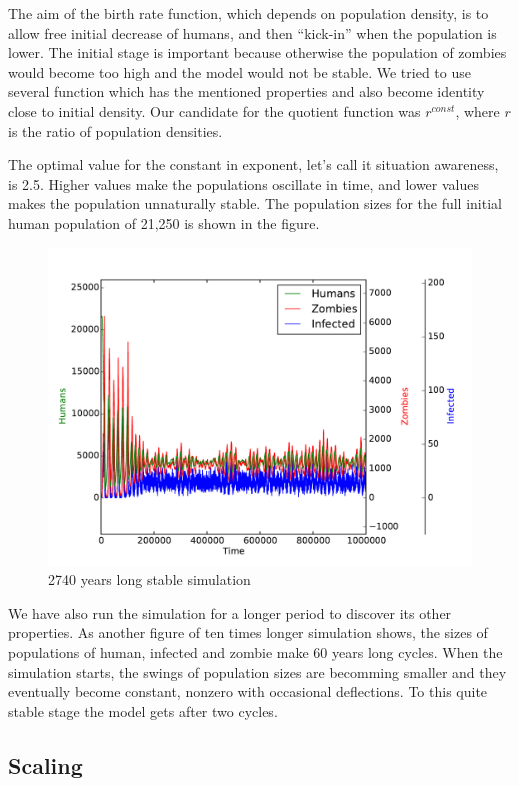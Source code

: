 \documentclass[a4paper]{article}
\begin{document}
The aim of the birth rate function, which depends on population density, is to allow free initial decrease of humans, and then ``kick-in'' when the population is lower.
The initial stage is important because otherwise the population of zombies would become too high and the model would not be stable.
We tried to use several function which has the mentioned properties and also become identity close to initial density.
Our candidate for the quotient function was $r^{const}$, where $r$ is the ratio of population densities.

The optimal value for the constant in exponent, let's call it situation awareness, is 2.5.
Higher values make the populations oscillate in time, and lower values makes the population unnaturally stable.
The population sizes for the full initial human population of 21,250 is shown in the figure.

\begin{figure}[pht]
    \centering
    \includegraphics[width=\textwidth]{stable_1000000}
    \caption{2740 years long stable simulation}
\end{figure}

We have also run the simulation for a longer period to discover its other properties.
As another figure of ten times longer simulation shows, the sizes of populations of human, infected and zombie make 60 years long cycles.
When the simulation starts, the swings of population sizes are becomming smaller and they eventually become constant, nonzero with occasional deflections.
To this quite stable stage the model gets after two cycles.

\subsection{Scaling}
\end{document}
